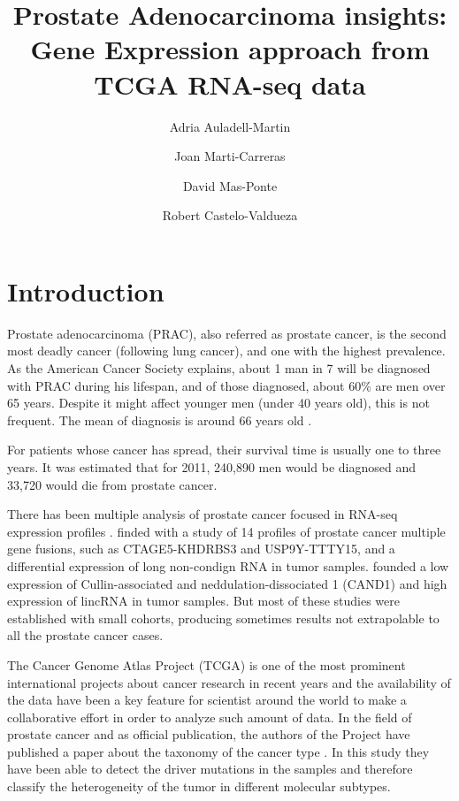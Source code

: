 \documentclass[9pt,twocolumn,twoside]{gsajnl}
\title{Prostate Adenocarcinoma insights: Gene Expression approach from TCGA RNA-seq data}
\author[$\ast$,$\dagger$]{Adria Auladell-Martin}
\author[$\ast$,$\dagger$]{Joan Marti-Carreras}
\author[$\ast$,$\dagger$]{David Mas-Ponte}
\author[$\ast$,1]{Robert Castelo-Valdueza}
\affil[$\ast$]{M.Sc. in Bioinformatics at Department of Experimental and Health Sciences (CEXS), Universitat Pompeu Fabra}
\affil[$\dagger$]{Authors Contributed Equally to this work}
\begin{document}
\maketitle
\thispagestyle{firststyle}
\marginmark
\firstpagefootnote
{}
\vspace{-11pt}%

\section*{Introduction}

Prostate adenocarcinoma (PRAC), also referred as prostate cancer, is  the second most deadly cancer (following lung cancer), and one with the highest prevalence. As the American Cancer Society explains, about 1 man in 7 will be diagnosed with PRAC during his lifespan, and of those diagnosed, about 60\% are men over 65 years. Despite it might affect younger men (under 40 years old), this is not frequent. The mean of diagnosis is around 66 years old \citep{prostatestatistics}.

For patients whose cancer has spread, their survival time is usually one to three years. It was estimated that for 2011, 240,890 men would be diagnosed and 33,720 would die from prostate cancer. 

There has been multiple analysis of prostate cancer focused in RNA-seq expression profiles \citep{rnaseq1,rnaseq2,zhai,rnaseq4}. \cite{rnaseq1} finded with a study of 14 profiles of prostate cancer multiple gene fusions, such as CTAGE5-KHDRBS3 and USP9Y-TTTY15, and a differential expression of long non-condign RNA in tumor samples. \cite{zhai} founded a low expression of Cullin-associated and neddulation-dissociated 1 (CAND1) and high expression of lincRNA in tumor samples.  But most of these studies were established with small cohorts, producing sometimes results not extrapolable to all the prostate cancer cases.

 The Cancer Genome Atlas Project (TCGA) \citep{tgca} is one of the most prominent international projects about cancer research in recent years and the availability of the data have been a key feature for scientist around the world to make a collaborative effort in order to analyze such amount of data. In the field of prostate cancer and as official publication, the authors of the Project have published a paper about the taxonomy of the cancer type \citep{Abeshouse2015}. In this study they have been able to detect the driver mutations in the samples and therefore classify the heterogeneity of the tumor in different molecular subtypes. 
 
\end{document}
